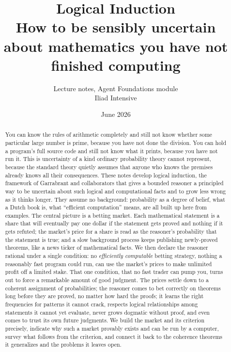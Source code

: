 \documentclass[10pt]{article}
\title{Logical Induction \\[1ex]
{\large How to be sensibly uncertain about mathematics you have not finished computing}}
\author{Lecture notes, Agent Foundations module \\ Iliad Intensive}
\date{June 2026}
\theoremstyle{definition}
\theoremstyle{remark}
\begin{document}
\maketitle

\begin{abstract}
You can know the rules of arithmetic completely and still not know whether some particular large number is prime, because you have not done the division. You can hold a program's full source code and still not know what it prints, because you have not run it. This is uncertainty of a kind ordinary probability theory cannot represent, because the standard theory quietly assumes that anyone who knows the premises already knows all their consequences. These notes develop logical induction, the framework of Garrabrant and collaborators that gives a bounded reasoner a principled way to be uncertain about such logical and computational facts and to grow less wrong as it thinks longer. They assume no background: probability as a degree of belief, what a Dutch book is, what ``efficient computation'' means, are all built up here from examples. The central picture is a betting market. Each mathematical statement is a share that will eventually pay one dollar if the statement gets proved and nothing if it gets refuted; the market's price for a share is read as the reasoner's probability that the statement is true; and a slow background process keeps publishing newly-proved theorems, like a news ticker of mathematical facts. We then declare the reasoner rational under a single condition: no \emph{efficiently computable} betting strategy, nothing a reasonably fast program could run, can use the market's prices to make unlimited profit off a limited stake. That one condition, that no fast trader can pump you, turns out to force a remarkable amount of good judgment. The prices settle down to a coherent assignment of probabilities; the reasoner comes to bet correctly on theorems long before they are proved, no matter how hard the proofs; it learns the right frequencies for patterns it cannot crack, respects logical relationships among statements it cannot yet evaluate, never grows dogmatic without proof, and even comes to trust its own future judgments. We build the market and its criterion precisely, indicate why such a market provably exists and can be run by a computer, survey what follows from the criterion, and connect it back to the coherence theorems it generalizes and the problems it leaves open.
\end{abstract}

\tableofcontents
\end{document}

